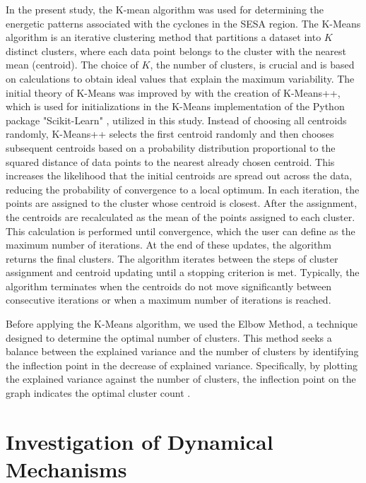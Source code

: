 In the present study, the K-mean algorithm was used for determining the energetic patterns associated with the cyclones in the SESA region. The K-Means algorithm \citep{macqueen1967} is an iterative clustering method that partitions a dataset into \( K \) distinct clusters, where each data point belongs to the cluster with the nearest mean (centroid). The choice of \( K \), the number of clusters, is crucial and is based on calculations to obtain ideal values that explain the maximum variability. The initial theory of K-Means was improved by \citet{DavidVassilvitskii2007} with the creation of K-Means++, which is used for initializations in the K-Means implementation of the Python package "Scikit-Learn" \citep{scitkit-learn}, utilized in this study. Instead of choosing all centroids randomly, K-Means++ selects the first centroid randomly and then chooses subsequent centroids based on a probability distribution proportional to the squared distance of data points to the nearest already chosen centroid. This increases the likelihood that the initial centroids are spread out across the data, reducing the probability of convergence to a local optimum. In each iteration, the points are assigned to the cluster whose centroid is closest. After the assignment, the centroids are recalculated as the mean of the points assigned to each cluster. This calculation is performed until convergence, which the user can define as the maximum number of iterations. At the end of these updates, the algorithm returns the final clusters. The algorithm iterates between the steps of cluster assignment and centroid updating until a stopping criterion is met. Typically, the algorithm terminates when the centroids do not move significantly between consecutive iterations or when a maximum number of iterations is reached.

Before applying the K-Means algorithm, we used the Elbow Method, a technique designed to determine the optimal number of clusters. This method seeks a balance between the explained variance and the number of clusters by identifying the inflection point in the decrease of explained variance. Specifically, by plotting the explained variance against the number of clusters, the inflection point on the graph indicates the optimal cluster count \citep{Thorndike1953}.

\section{Investigation of Dynamical Mechanisms}\label{sec:ibc_ibt_analysis}

